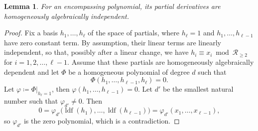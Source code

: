 \documentclass[a4paper,11pt,reqno]{amsart}
\newcommand{\calR}{\mathcal{R}}
\DeclareMathOperator{\ldf}{ldf}
\numberwithin{equation}{section}
\theoremstyle{definition}
\theoremstyle{plain}
\newtheorem{lem}[defn]{Lemma}
\theoremstyle{remark}
\begin{document}
\begin{lem}\label{lem:encompassingImpliesHomAlgIndep}
    For an encompassing polynomial, its partial derivatives are homogeneously
    algebraically independent.
\end{lem}
\begin{proof}
    Fix a basis $h_1, \ldots , h_{\ell}$ of the space of partials, where
    $h_{\ell}
    = 1$ and $h_1, \ldots , h_{\ell-1}$ have zero constant term. By assumption,
    their linear terms are linearly independent, so that, {possibly} after a
    linear change, we have $h_i \equiv x_i\bmod \calR_{\geq 2}$ for $i=1,2,
    \ldots ,\ell-1$. Assume that these partials are homogeneously
    algebraically dependent and let $\Phi$ be a homogeneous polynomial of
    degree $d$ such that
    \[
        \Phi(h_1, \ldots ,h_{\ell-1}, h_{\ell}) = 0.
    \]
    Let $\varphi \coloneq \Phi|_{h_{\ell}=1}$, then $\varphi(h_1, \ldots
    ,h_{\ell-1}) = 0$. Let $d'$ be the smallest natural number such that
    $\varphi_{d'} \neq 0$. Then
    \[
        0 = \varphi_{d'}\bigl(\ldf(h_1), \ldots ,\ldf(h_{\ell-1})\bigr) =
        \varphi_{d'}(x_1, \ldots ,x_{\ell-1}),
    \]
    so $\varphi_{d'}$ is the zero polynomial, which is a contradiction.
\end{proof}
\end{document}
